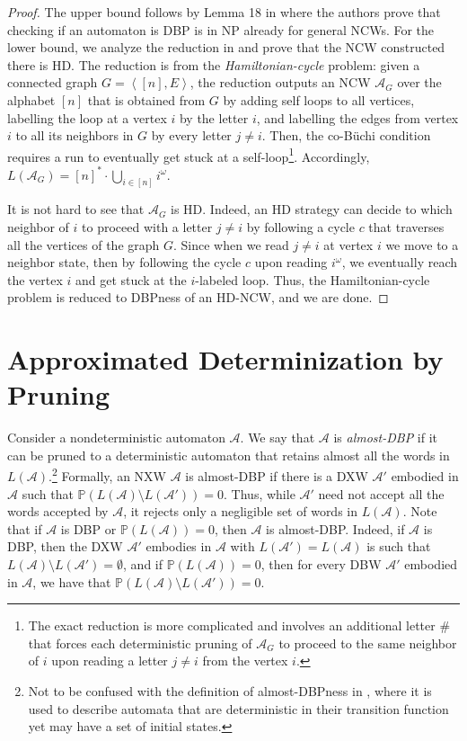 \documentclass[10pt,a4paper]{amsart}
\theoremstyle{definition}
\numberwithin{equation}{section}
\newcommand{\buchi}{B\"uchi\xspace}
\newcommand{\A}{{\mathcal A}}
\newcommand{\zug}[1]{\left\langle #1 \right\rangle}
\renewcommand{\P}{\mathbb{P}}
\begin{document}
\begin{proof}
The upper bound follows by Lemma 18 in \cite{KM18} where the authors prove that checking if an automaton is DBP is in NP already for general NCWs.
For the lower bound, we analyze the reduction in \cite{KM18} and prove that the NCW constructed there is HD.
The reduction is from the \emph{Hamiltonian-cycle} problem: 
given a connected graph $G = \zug{[n], E}$, the reduction outputs an NCW $\A_G$ over the alphabet $[n]$
that is obtained from $G$ by adding self loops to all vertices, labelling the loop at a vertex $i$ by the letter $i$, and labelling the edges from vertex $i$ to all its neighbors in $G$ by every letter $j\neq i$. Then, the co-\buchi condition requires a run to eventually get stuck at a self-loop\footnote{The exact reduction is more complicated and involves an additional letter $\#$ that forces each deterministic pruning of $\A_G$ to proceed to the same neighbor of $i$ upon reading a letter $j\neq i$ from the vertex $i$.}. Accordingly, $L(\A_G) = [n]^*\cdot \bigcup_{i\in [n]} i^\omega$.

It is not hard to see that $\A_G$ is HD. Indeed, an HD strategy can decide to which neighbor of $i$ to proceed with a letter $j \neq i$ by following a cycle $c$ that traverses all the vertices of the graph $G$. Since when we read $j \neq i$ at vertex $i$ we move to a neighbor state, then by following the cycle $c$ upon reading $i^\omega$, we eventually reach the vertex $i$ and get stuck at the $i$-labeled loop. Thus, the Hamiltonian-cycle problem is reduced to DBPness of an HD-NCW, and we are done.
\end{proof}



\section{Approximated Determinization by Pruning}
\label{sec prob}

Consider a nondeterministic automaton $\A$. 
We say that $\A$ is {\em almost-DBP\/} if it can be pruned to a deterministic automaton that retains almost all the words in $L(\A)$.\footnote{Not to be confused with the definition of almost-DBPness in \cite{AKL10}, where it is used to describe automata that are deterministic in their transition function yet may have a set of initial states.}
Formally, an NXW $\A$ is almost-DBP if there is a DXW $\A'$ embodied in $\A$ such that $\P(L(\A)\setminus L(\A'))=0$. 
Thus, while $\A'$ need not accept all the words accepted by $\A$, it rejects only a negligible set of words in $L(\A)$. 
Note that if $\A$ is DBP or $\P(L(\A))=0$, then $\A$ is almost-DBP. Indeed, if $\A$ is DBP, then the DXW $\A'$ embodies in $\A$ with $L(\A')=L(\A)$ is such that $L(\A)\setminus L(\A')=\emptyset$, and if $\P(L(\A))=0$, then for every DBW $\A'$ embodied in $\A$, we have that $\P(L(\A)\setminus L(\A'))=0$. 
\end{document}
